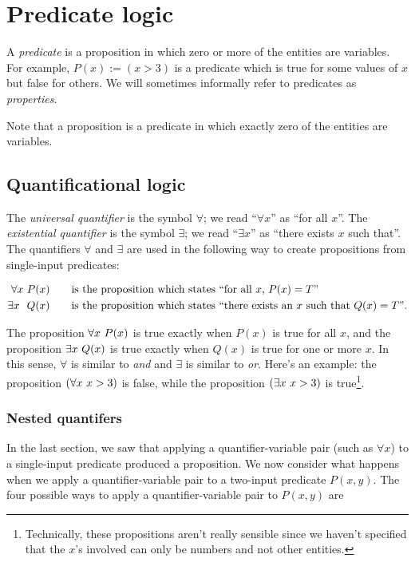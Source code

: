 \newpage

\section{Predicate logic}

A \textit{predicate} is a proposition in which zero or more of the entities are variables. For example, $P(x) := (x > 3)$ is a predicate which is true for some values of $x$ but false for others. We will sometimes informally refer to predicates as \textit{properties}.

Note that a proposition is a predicate in which exactly zero of the entities are variables.

\subsection*{Quantificational logic}

The \textit{universal quantifier} is the symbol $\forall$; we read ``$\forall x$'' as ``for all $x$''. The \textit{existential quantifier} is the symbol $\exists$; we read ``$\exists x$'' as ``there exists $x$ such that''. The quantifiers $\forall$ and $\exists$ are used in the following way to create propositions from single-input predicates:

\begin{align*}
    \forall x \text{ } P(x) &\qquad \text{is the proposition which states ``for all $x$, $P(x) = T$''} \\
    \exists x \text{ } \text{ } Q(x) &\qquad \text{is the proposition which states ``there exists an $x$ such that $Q(x) = T$''}.
\end{align*}

The proposition $\forall x \text{ } P(x)$ is true exactly when $P(x)$ is true for all $x$, and the proposition $\exists x \text{ } Q(x)$ is true exactly when $Q(x)$ is true for one or more $x$. In this sense, $\forall$ is similar to \textit{and} and $\exists$ is similar to \textit{or}. Here's an example: the proposition $(\forall x \text{ } x > 3)$ is false, while the proposition $(\exists x \text{ } x > 3)$ is true\footnote{Technically, these propositions aren't really sensible since we haven't specified that the $x$'s involved can only be numbers and not other entities.}.

\subsubsection{Nested quantifers}

In the last section, we saw that applying a quantifier-variable pair (such as $\forall x$) to a single-input predicate produced a proposition. We now consider what happens when we apply a quantifier-variable pair to a two-input predicate $P(x, y)$. The four possible ways to apply a quantifier-variable pair to $P(x, y)$ are

